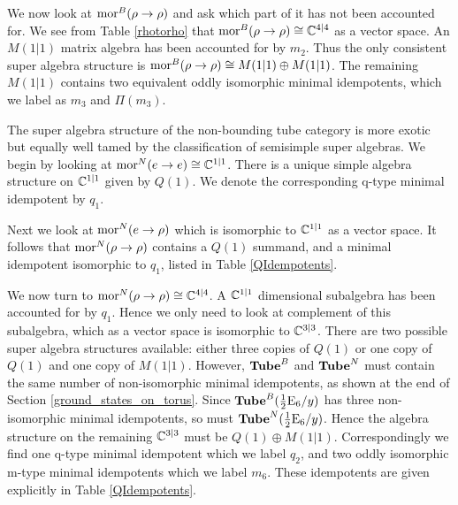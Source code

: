 We now look at $\text{mor}^B(\rho \to \rho)$ and ask which part of it has not been accounted for. 
We see from Table \ref{rhotorho} that $\text{mor}^B(\rho \to \rho) \cong \mathbb{C}^{4|4}$ as a vector space. 
An $M(1|1)$ matrix algebra has been accounted for by $m_2$. 
Thus the only consistent super algebra structure is $\text{mor}^B(\rho \to \rho) \cong M(1|1) \oplus M(1|1)$.
The remaining $M(1|1)$ contains two equivalent oddly isomorphic minimal idempotents, 
which we label as $m_3$ and $\Pi(m_3)$.


\medskip

The super algebra structure of the non-bounding tube category is more exotic but equally well tamed by the classification of semisimple super algebras.
We begin by looking at $\text{mor}^N(e\to e) \cong \mathbb{C}^{1|1}$. 
There is a unique simple algebra structure on $\mathbb{C}^{1|1}$ given by $Q(1)$. 
We denote the corresponding q-type minimal idempotent by $q_1$.

Next we look at $\text{mor}^N(e \to \rho)$ which is isomorphic to $\mathbb{C}^{1|1}$ as a vector space. 
It follows that $\text{mor}^N(\rho \to \rho)$ contains a $Q(1)$ summand, 
and a minimal idempotent isomorphic to $q_1$, listed in Table \ref{QIdempotents}. 

We now turn to $\text{mor}^N(\rho \to \rho) \cong \mathbb{C}^{4|4}$. 
A $\mathbb{C}^{1|1}$ dimensional subalgebra has been accounted for by $q_1$. 
Hence we only need to look at complement of this subalgebra, which as a vector space is isomorphic to $\mathbb{C}^{3|3}$.
There are two possible super algebra structures available: either three copies of $Q(1)$ or one copy of $Q(1)$ and one copy of $M(1|1)$.
However, $\textbf{Tube}^B$ and $\textbf{Tube}^N$ must contain the same number of non-isomorphic minimal idempotents, 
as shown at the end of Section \ref{ground_states_on_torus}. 
Since $\textbf{Tube}^B(\frac{1}{2}\text{E}_6/y)$ has three non-isomorphic minimal idempotents, 
so must $\textbf{Tube}^N(\frac{1}{2}\text{E}_6/y)$. 
Hence the algebra structure on the remaining $\mathbb{C}^{3|3}$ must be $Q(1)\oplus M(1|1)$.
Correspondingly we find one q-type minimal idempotent which we label $q_2$, 
and two oddly isomorphic m-type minimal idempotents which we label $m_6$.
These idempotents are given explicitly in Table \ref{QIdempotents}.

